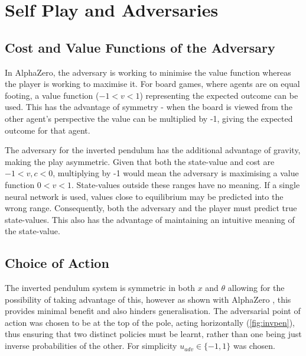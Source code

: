 \documentclass[../main.tex]{subfiles}
\begin{document}
\section{Self Play and Adversaries}

\subsection{Cost and Value Functions of the Adversary}

In AlphaZero, the adversary is working to minimise the value function whereas the player is working to maximise it. For board games, where agents are on equal footing, a value function ($-1 < v < 1$) representing the expected outcome can be used. This has the advantage of symmetry - when the board is viewed from the other agent's perspective the value can be multiplied by -1, giving the expected outcome for that agent.

The adversary for the inverted pendulum has the additional advantage of gravity, making the play asymmetric. Given that both the state-value and cost are $-1 < v, c < 0$, multiplying by -1 would mean the adversary is maximising a value function $0 < v < 1$. State-values outside these ranges have no meaning. If a single neural network is used, values close to equilibrium may be predicted into the wrong range. Consequently, both the adversary and the player must predict true state-values. This also has the advantage of maintaining an intuitive meaning of the state-value.

\subsection{Choice of Action}

The inverted pendulum system is symmetric in both $x$ and $\theta$ allowing for the possibility of taking advantage of this, however as shown with AlphaZero \cite{AlphaZero}, this provides minimal benefit and also hinders generalisation. The adversarial point of action was chosen to be at the top of the pole, acting horizontally (\cref{fig:invpen}), thus ensuring that two distinct policies must be learnt, rather than one being just inverse probabilities of the other. For simplicity $u_{adv} \in \{-1, 1\}$ was chosen.
\end{document}
